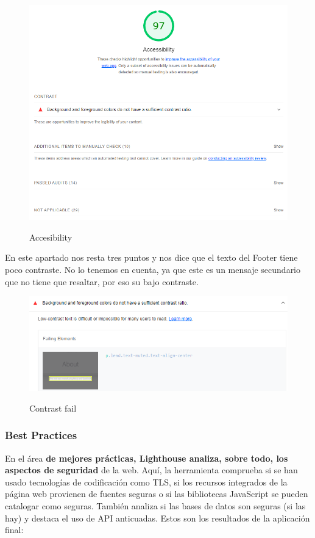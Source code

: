 \documentclass[12pt,twoside,titlepage]{report}
\begin{document}
\begin{figure}[H]
    \centering
    \includegraphics[scale=0.6]{Lighthouse/Accesibility}
    \label{fig:Lighthouse_accesibility}
    \caption{Accesibility}
\end{figure}

En este apartado nos resta tres puntos y nos dice que el texto del Footer tiene poco contraste. No lo tenemos en cuenta, ya que este es un mensaje secundario que no tiene que resaltar, por eso su bajo contraste.

\begin{figure}[H]
    \centering
    \includegraphics[scale=0.6]{Lighthouse/AccesibilityContrast}
    \label{fig:Lighthouse_contrast}
    \caption{Contrast fail}
\end{figure}

\subsubsection{Best Practices}

En el área \textbf{de mejores prácticas, Lighthouse analiza, sobre todo, los aspectos de seguridad} de la web. Aquí, la herramienta comprueba si se han usado tecnologías de codificación como TLS, si los recursos integrados de la página web provienen de fuentes seguras o si las bibliotecas JavaScript se pueden catalogar como seguras. También analiza si las bases de datos son seguras (si las hay) y destaca el uso de API anticuadas. Estos son los resultados de la aplicación final:
\end{document}
